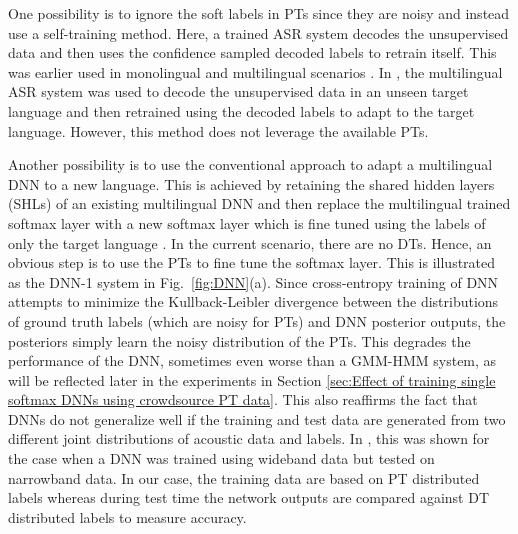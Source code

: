 \documentclass[a4paper]{article}
\begin{document}
One possibility is to ignore the soft labels in PTs since they are noisy and instead use a self-training method. Here, a trained ASR system decodes the unsupervised data and then uses the confidence sampled decoded labels to retrain itself. This was earlier used in monolingual \cite{Vesely-SemisupTrainingDNN} and multilingual scenarios \cite{Knill-SelfTrainingAndUnsupAdapt}. In \cite{Knill-SelfTrainingAndUnsupAdapt}, the multilingual ASR system was used to decode the unsupervised data in an unseen target language and then retrained using the decoded labels to adapt to the target language. %
However, this method does not leverage the available PTs. 

Another possibility is to use the conventional approach to adapt a multilingual DNN to a new language. This is achieved by retaining the shared hidden layers (SHLs)  \cite{Huang-MultilingualSHL} of an existing multilingual DNN and then replace the multilingual trained softmax layer with a new softmax layer which is fine tuned using the labels of only the target language \cite{Ghoshal-MultilingualPretraining}. In the current scenario, there are no DTs. Hence, an obvious step is to use the PTs to fine tune the softmax layer. This is illustrated as the DNN-1 system in Fig.~\ref{fig:DNN}(a). Since cross-entropy training of DNN attempts to minimize the Kullback-Leibler divergence between the distributions of ground truth labels (which are noisy for PTs) and DNN posterior outputs, the posteriors simply learn the noisy distribution of the PTs. This degrades the performance of the DNN, sometimes even worse than a GMM-HMM system, as will be reflected later in the experiments in Section \ref{sec:Effect of training single softmax DNNs using crowdsource PT data}. This also reaffirms the fact that DNNs do not generalize well if the training and test data are generated from two different joint distributions of acoustic data and labels. In \cite{Yu-FeatureLearning}, this was shown for the case when a DNN was trained using wideband data but tested on narrowband data. In our case, the training data are based on PT distributed labels whereas during test time the network outputs are compared against DT distributed labels to measure accuracy.
\end{document}
